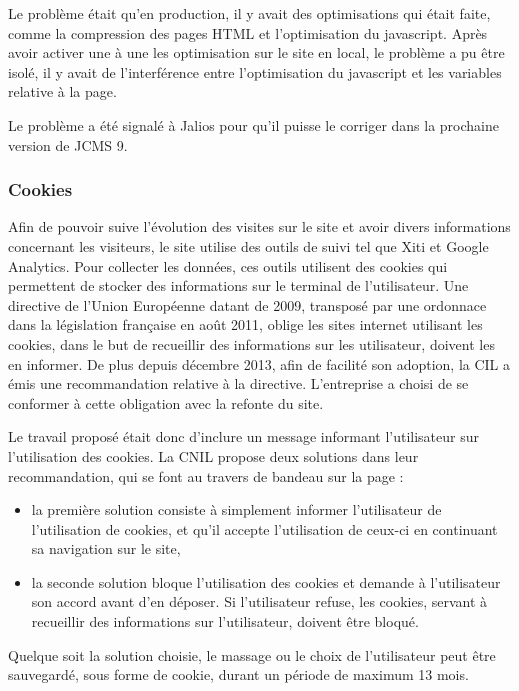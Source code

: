 \documentclass[12pt,a4paper]{article}
\begin{document}
Le problème était qu'en production, il y avait des optimisations qui était faite, comme la compression des pages HTML et l'optimisation du javascript. Après avoir activer une à une les optimisation sur le site en local, le problème a pu être isolé, il y avait de l'interférence entre l'optimisation du javascript et les variables relative à la page.\par 
Le problème a été signalé à Jalios pour qu'il puisse le corriger dans la prochaine version de JCMS 9.\par

\subsubsection{Cookies}
Afin de pouvoir suive l'évolution des visites sur le site et avoir divers informations concernant les visiteurs, le site utilise des outils de suivi tel que Xiti et Google Analytics. Pour collecter les données, ces outils utilisent des cookies qui permettent de stocker des informations sur le terminal de l'utilisateur. Une directive de l'Union Européenne datant de 2009, transposé par une ordonnace dans la législation française en août 2011, oblige les sites internet utilisant les cookies, dans le but de recueillir des informations sur les utilisateur, doivent les en informer. De plus depuis décembre 2013, afin de facilité son adoption, la CIL a émis une recommandation relative à la directive. L'entreprise a choisi de se conformer à cette obligation avec la refonte du site.\par 
Le travail proposé était donc d'inclure un message informant l'utilisateur sur l'utilisation des cookies. La CNIL propose deux solutions dans leur recommandation, qui se font au travers de bandeau sur la page :
\begin{itemize}
\item la première solution consiste à simplement informer l'utilisateur de l'utilisation de cookies, et qu'il accepte l'utilisation de ceux-ci en continuant sa navigation sur le site,
\item la seconde solution bloque l'utilisation des cookies et demande à l'utilisateur son accord avant d'en déposer. Si l'utilisateur refuse, les cookies, servant à recueillir des informations sur l'utilisateur, doivent être bloqué.
\end{itemize}\par 
Quelque soit la solution choisie, le massage ou le choix de l'utilisateur peut être sauvegardé, sous forme de cookie, durant un période de maximum 13 mois.\par 
\end{document}
